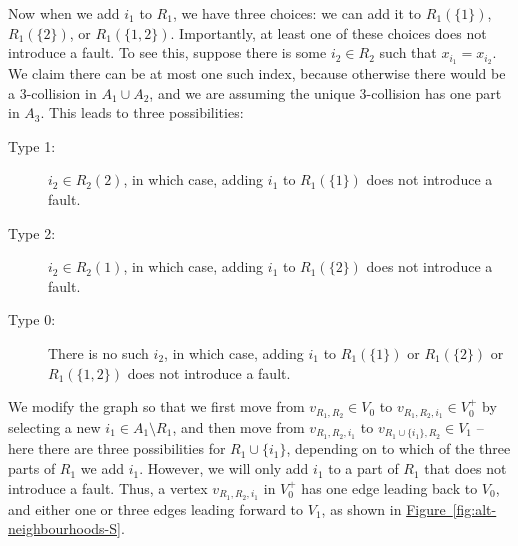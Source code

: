 \documentclass{article}
\newcommand{\fig}[1]{\hyperref[fig:#1]{Figure~\ref*{fig:#1}}}
\renewcommand{\>}{\rangle}
\newcommand{\<}{\langle}
\renewcommand{\(}{\left(}
\renewcommand{\)}{\right)}
\begin{document}
Now when we add $i_1$ to $R_1$, we have three choices: we can add it to $R_1(\{1\})$, $R_1(\{2\})$, or $R_1(\{1,2\})$. Importantly, at least one of these choices does not introduce a fault. To see this, suppose there is some $i_2\in R_2$ such that $x_{i_1}=x_{i_2}$. We claim there can be at most one such index, because otherwise there would be a 3-collision in $A_1\cup A_2$, and we are assuming the unique 3-collision has one part in $A_3$. This leads to three possibilities:
\begin{description}
\item[Type 1:] $i_2\in R_2(2)$, in which case, adding $i_1$ to $R_1(\{1\})$ does not introduce a fault.
\item[Type 2:] $i_2\in R_2(1)$, in which case, adding $i_1$ to $R_1(\{2\})$ does not introduce a fault.
\item[Type 0:] There is no such $i_2$, in which case, adding $i_1$ to $R_1(\{1\})$ or $R_1(\{2\})$ or $R_1(\{1,2\})$ does not introduce a fault.
\end{description}
We modify the graph so that we first move from $v_{R_1,R_2}\in V_0$ to $v_{R_1,R_2,i_1}\in V_0^+$ by selecting a new $i_1\in A_1\setminus R_1$, and then move from $v_{R_1,R_2,i_1}$ to $v_{R_1\cup\{i_1\},R_2}\in V_1$ -- here there are three possibilities for $R_1\cup\{i_1\}$, depending on to which of the three parts of $R_1$ we add $i_1$. However, we will only add $i_1$ to a part of $R_1$ that does not introduce a fault. Thus, a vertex $v_{R_1,R_2,i_1}$ in $V_0^+$ has one edge leading back to $V_0$, and either one or three edges leading forward to $V_1$, as shown in \fig{alt-neighbourhoods-S}.
\end{document}
